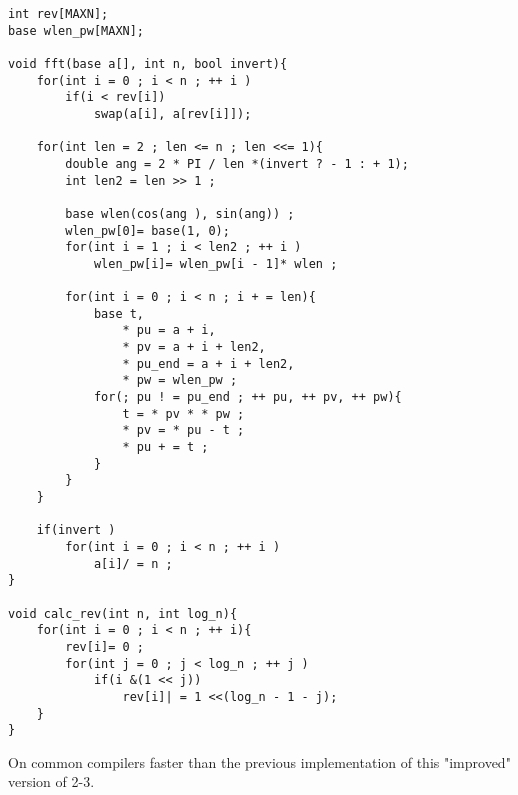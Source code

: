 \begin{verbatim}
int rev[MAXN];
base wlen_pw[MAXN];
 
void fft(base a[], int n, bool invert){
    for(int i = 0 ; i < n ; ++ i )
        if(i < rev[i])
            swap(a[i], a[rev[i]]);
 
    for(int len = 2 ; len <= n ; len <<= 1){
        double ang = 2 * PI / len *(invert ? - 1 : + 1);
        int len2 = len >> 1 ;
 
        base wlen(cos(ang ), sin(ang)) ;
        wlen_pw[0]= base(1, 0);
        for(int i = 1 ; i < len2 ; ++ i )
            wlen_pw[i]= wlen_pw[i - 1]* wlen ;
 
        for(int i = 0 ; i < n ; i + = len){
            base t,
                * pu = a + i,
                * pv = a + i + len2, 
                * pu_end = a + i + len2,
                * pw = wlen_pw ;
            for(; pu ! = pu_end ; ++ pu, ++ pv, ++ pw){
                t = * pv * * pw ;
                * pv = * pu - t ;
                * pu + = t ;
            }
        }
    }
 
    if(invert )
        for(int i = 0 ; i < n ; ++ i )
            a[i]/ = n ;
}
 
void calc_rev(int n, int log_n){
    for(int i = 0 ; i < n ; ++ i){
        rev[i]= 0 ;
        for(int j = 0 ; j < log_n ; ++ j )
            if(i &(1 << j))
                rev[i]| = 1 <<(log_n - 1 - j);
    }
} 
\end{verbatim}
On common compilers faster than the previous implementation of this "improved" version of 2-3.
